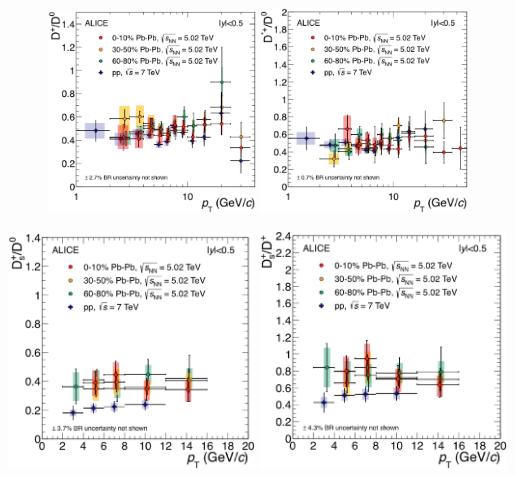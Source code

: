 \begin{figure}[!t]
\includegraphics[width=0.49\textwidth]{FigCap5/RatioDplusDzero-PbPb-010-3050-6080-502-pp-7.eps}
\includegraphics[width=0.49\textwidth]{FigCap5/RatioDstarDzero-PbPb-010-3050-6080-502-pp-7.eps}
 \label{fig:DmesRatio} 
\end{figure} 


\includegraphics[width=0.49\textwidth]{FigCap5/RatioDsD0-PbPb-010-3050-6080-502-pp-7.eps}
\includegraphics[width=0.49\textwidth]{FigCap5/RatioDsDplus-PbPb-010-3050-6080-502-pp-7.eps}

